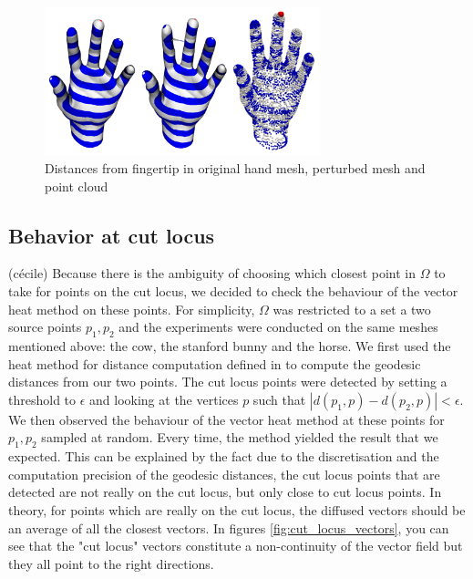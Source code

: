 \documentclass[sigconf, nonacm]{acmart}
\begin{document}
\begin{figure}
  \centering
  \includegraphics[width=8cm]{hands_distances.png}
  \caption{Distances from fingertip in original hand mesh, perturbed mesh and point cloud}
  \label{fig:hand_distances}
\end{figure}

\subsection{Behavior at cut locus}
(cécile)
Because there is the ambiguity of choosing which closest point in $\Omega$ to take for points on the cut locus, we decided to check 
the behaviour of the vector heat method on these points. For simplicity, $\Omega$ was restricted to a set a two source points $p_1, p_2$ and 
the experiments were conducted on the same meshes mentioned above: the cow, the stanford bunny and the horse. We first used the heat method for 
distance computation defined in \cite{crane_geodesics_2013} to compute the geodesic distances from our two points. The cut locus
points were detected by setting a threshold to $\epsilon$ and looking at the vertices $p$ such that $|d(p_1, p) - d(p_2, p)|<\epsilon$. We then 
observed the behaviour of the vector heat method at these points for $p_1, p_2$ sampled at random. Every time, the method yielded the result that 
we expected. This can be explained by the fact due to the discretisation and the computation precision of the geodesic distances, the cut locus 
points that are detected are not really on the cut locus, but only close to cut locus points. In theory, for points which are really on the cut 
locus, the diffused vectors should be an average of all the closest vectors. In figures \ref{fig:cut_locus_vectors}, you can see that
the "cut locus" vectors constitute a non-continuity of the vector field but they all point to the right directions. 
\end{document}
